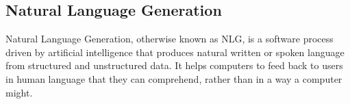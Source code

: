 \subsection{Natural Language Generation}

\cite{AWSNLP:1}Natural Language Generation, otherwise known as NLG, is a software process driven by artificial intelligence that produces natural written or spoken language from structured and unstructured data. It helps computers to feed back to users in human language that they can comprehend, rather than in a way a computer might.
